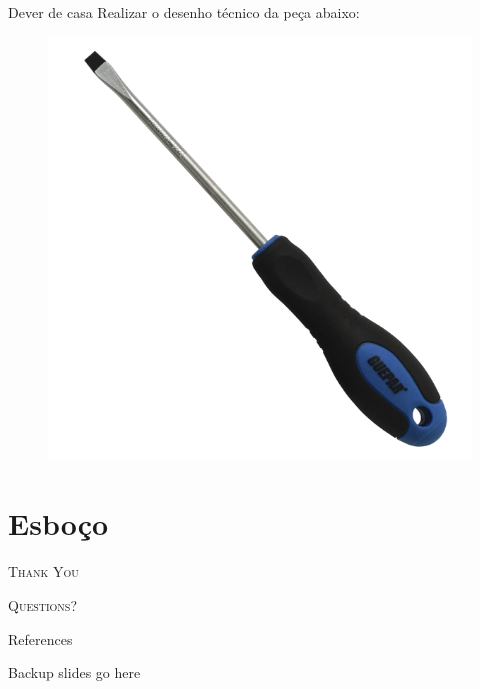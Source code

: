\documentclass{cubeamer}
\begin{document}
\begin{frame}{Dever de casa}
    Realizar o desenho técnico da peça abaixo:
    \newline
    \begin{center}
        \begin{figure}
            \centering
            \includegraphics[height = 0.5\textheight]{img/dever1.png}
            \caption{\cite{Chavede:online}}
        \end{figure}
    \end{center}
    
\end{frame}

\section*{Esboço}



\begin{frame}[standout]
    \Huge\textsc{Thank You}
    
    \vfill
    
    \LARGE\textsc{Questions?}
\end{frame}
\begin{frame}[t, allowframebreaks]{References}
    
    
\end{frame}

\appendix

\begin{frame}{Backup slides go here}
    
\end{frame}
\end{document}
